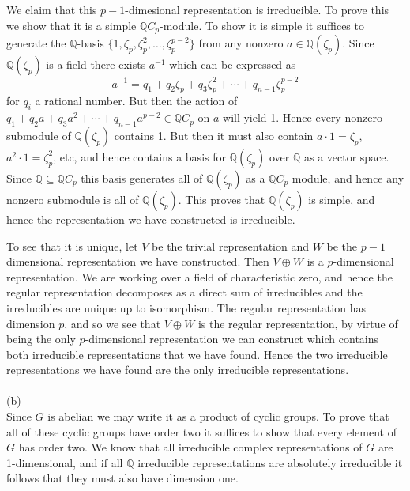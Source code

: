 \documentclass[11pt]{article}
\newcommand{\Q}{\mathbb{Q}}
\begin{document}
We claim that this $p-1$-dimesional representation is irreducible. To prove this we show that it is a simple $\Q C_p$-module. To show it is simple it suffices to generate the $\Q$-basis $\{1,\zeta_p, \zeta_p^2,\ldots, \zeta_p^{p-2}\}$ from any nonzero $a\in \Q(\zeta_p)$. Since $\Q(\zeta_p)$ is a field there exists $a^{-1}$ which can be expressed as \[
a^{-1} = q_1 + q_2\zeta_p + q_3\zeta_p^2 + \cdots + q_{n-1}\zeta_p^{p-2}
\]
for $q_i$ a rational number. But then the action of $q_1 + q_2 a + q_3 a^2 + \cdots + q_{n-1} a^{p-2} \in \Q C_p$ on $a$ will yield 1. Hence every nonzero submodule of $\Q(\zeta_p)$ contains 1. But then it must also contain $a\cdot 1 = \zeta_p$, $a^2\cdot 1 = \zeta_p^2$, etc, and hence contains a basis for $\Q(\zeta_p)$ over $\Q$ as a vector space. Since $\Q\subseteq \Q C_p$ this basis generates all of $\Q(\zeta_p)$ as a $\Q C_p$ module, and hence any nonzero submodule is all of $\Q(\zeta_p)$. This proves that $ \Q(\zeta_p)$ is simple, and hence the representation we have constructed is irreducible.

To see that it is unique, let $V$ be the trivial representation and $W$ be the $p-1$ dimensional representation we have constructed. Then $V\oplus W$ is a $p$-dimensional representation. We are working over a field of characteristic zero, and hence the regular representation decomposes as a direct sum of irreducibles and the irreducibles are unique up to isomorphism. The regular representation has dimension $p$, and so we see that $V\oplus W$ is the regular representation, by virtue of being the only $p$-dimensional representation we can construct which contains both irreducible representations that we have found. Hence the two irreducible representations we have found are the only irreducible representations. 
\\\\
(b)\\
Since $G$ is abelian we may write it as a product of cyclic groups. To prove that all of these cyclic groups have order two it suffices to show that every element of $G$ has order two. We know that all irreducible complex representations of $G$ are 1-dimensional, and if all $\Q$ irreducible representations are absolutely irreducible it follows that they must also have dimension one.
\end{document}
